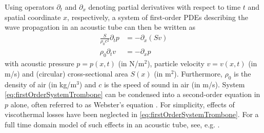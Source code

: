 Using operators $\partial_t$ and $\partial_x$ denoting partial derivatives with respect to time $t$ and spatial coordinate $x$, respectively, a system of first-order PDEs describing the wave propagation in an acoustic tube can then be written as
\begin{subequations}\label{eq:firstOrderSystemTrombone}
    \begin{align}
        \frac{S}{\rho_0 c^2}\partial_t p &= -\partial_x(Sv)\label{eq:contPressureTrombone}\\
        \rho_0\partial_tv &= -\partial_xp\label{eq:contVelocityTrombone}
    \end{align}
\end{subequations}
with acoustic pressure $p = p(x,t)$ (in N/m$^2$), particle velocity $v = v(x,t)$ (in m/s) and (circular) cross-sectional area $S(x)$ (in m$^2$). Furthermore, $\rho_0$ is the density of air (in kg/m$^3$) and $c$ is the speed of sound in air (in m/s). System \eqref{eq:firstOrderSystemTrombone} can be condensed into a second-order equation in $p$ alone, often referred to as Webster's equation \cite{Webster19}.    For simplicity, effects of viscothermal losses have been neglected in \eqref{eq:firstOrderSystemTrombone}. For a full time domain model of such effects in an acoustic tube, see, e.g. \cite{Bilbao2016}. 
